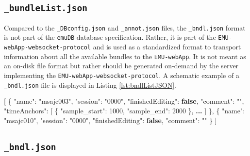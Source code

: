 \documentclass[]{book}
\newenvironment{Shaded}{\begin{snugshade}}{\end{snugshade}}
\newcommand{\DataTypeTok}[1]{\textcolor[rgb]{0.13,0.29,0.53}{#1}}
\newcommand{\DecValTok}[1]{\textcolor[rgb]{0.00,0.00,0.81}{#1}}
\newcommand{\ErrorTok}[1]{\textcolor[rgb]{0.64,0.00,0.00}{\textbf{#1}}}
\newcommand{\FunctionTok}[1]{\textcolor[rgb]{0.00,0.00,0.00}{#1}}
\newcommand{\KeywordTok}[1]{\textcolor[rgb]{0.13,0.29,0.53}{\textbf{#1}}}
\newcommand{\OtherTok}[1]{\textcolor[rgb]{0.56,0.35,0.01}{#1}}
\newcommand{\StringTok}[1]{\textcolor[rgb]{0.31,0.60,0.02}{#1}}
\theoremstyle{definition}
\theoremstyle{definition}
\theoremstyle{definition}
\theoremstyle{remark}
\begin{document}
\hypertarget{subsec:app-chapExampleFilesBundleList}{%
\subsection{\texorpdfstring{\texttt{\_bundleList.json}}{\_bundleList.json}}\label{subsec:app-chapExampleFilesBundleList}}

Compared to the \texttt{\_DBconfig.json} and \texttt{\_annot.json}
files, the \texttt{\_bndl.json} format is not part of the \texttt{emuDB}
database specification. Rather, it is part of the
\texttt{EMU-webApp-websocket-protocol} and is used as a standardized
format to transport information about all the available bundles to the
\texttt{EMU-webApp}. It is not meant as an on-disk file format but
rather should be generated on-demand by the server implementing the
\texttt{EMU-webApp-websocket-protocol}. A schematic example of a
\texttt{\_bndl.json} file is displayed in Listing
\ref{lst:bndlListJSON}.

\begin{Shaded}
\begin{Highlighting}[]
\OtherTok{[}
  \FunctionTok{\{}
  \DataTypeTok{"name"}\FunctionTok{:} \StringTok{"msajc003"}\FunctionTok{,}
  \DataTypeTok{"session"}\FunctionTok{:} \StringTok{"0000"}\FunctionTok{,}
  \DataTypeTok{"finishedEditing"}\FunctionTok{:} \KeywordTok{false}\FunctionTok{,}
  \DataTypeTok{"comment"}\FunctionTok{:} \StringTok{""}\FunctionTok{,}
  \DataTypeTok{"timeAnchors"}\FunctionTok{:} \OtherTok{[}
    \FunctionTok{\{}
      \DataTypeTok{"sample_start"}\FunctionTok{:} \DecValTok{1000}\FunctionTok{,}
      \DataTypeTok{"sample_end"}\FunctionTok{:} \DecValTok{2000}
    \FunctionTok{\}}\OtherTok{,} \ErrorTok{...}
  \OtherTok{]}
  \FunctionTok{\}}\OtherTok{,}
  \FunctionTok{\{}
  \DataTypeTok{"name"}\FunctionTok{:} \StringTok{"msajc010"}\FunctionTok{,}
  \DataTypeTok{"session"}\FunctionTok{:} \StringTok{"0000"}\FunctionTok{,}
  \DataTypeTok{"finishedEditing"}\FunctionTok{:} \KeywordTok{false}\FunctionTok{,}
  \DataTypeTok{"comment"}\FunctionTok{:} \StringTok{""}
  \FunctionTok{\}}
\OtherTok{]}
\end{Highlighting}
\end{Shaded}

\hypertarget{subsec:app-chapExampleFilesBndlJSON}{%
\subsection{\texorpdfstring{\texttt{\_bndl.json}}{\_bndl.json}}\label{subsec:app-chapExampleFilesBndlJSON}}
\end{document}
